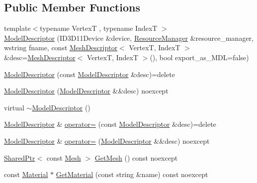 \subsection*{Public Member Functions}
\begin{DoxyCompactItemize}
\item 
{\footnotesize template$<$typename VertexT , typename IndexT $>$ }\\\hyperlink{classmage_1_1rendering_1_1_model_descriptor_aa27c73a72219352647cd31ddfd6e64d6}{Model\+Descriptor} (I\+D3\+D11\+Device \&device, \hyperlink{classmage_1_1rendering_1_1_resource_manager}{Resource\+Manager} \&resource\+\_\+manager, wstring fname, const \hyperlink{classmage_1_1rendering_1_1_mesh_descriptor}{Mesh\+Descriptor}$<$ VertexT, IndexT $>$ \&desc=\hyperlink{classmage_1_1rendering_1_1_mesh_descriptor}{Mesh\+Descriptor}$<$ VertexT, IndexT $>$(), bool export\+\_\+as\+\_\+\+M\+DL=false)
\item 
\hyperlink{classmage_1_1rendering_1_1_model_descriptor_af3fc0dea0060aa15a8003a7f4f807dd0}{Model\+Descriptor} (const \hyperlink{classmage_1_1rendering_1_1_model_descriptor}{Model\+Descriptor} \&desc)=delete
\item 
\hyperlink{classmage_1_1rendering_1_1_model_descriptor_a0e7a576be083c9499a074cfd39acbcb7}{Model\+Descriptor} (\hyperlink{classmage_1_1rendering_1_1_model_descriptor}{Model\+Descriptor} \&\&desc) noexcept
\item 
virtual \hyperlink{classmage_1_1rendering_1_1_model_descriptor_adef21799bc748828e8e04bc74f86aac0}{$\sim$\+Model\+Descriptor} ()
\item 
\hyperlink{classmage_1_1rendering_1_1_model_descriptor}{Model\+Descriptor} \& \hyperlink{classmage_1_1rendering_1_1_model_descriptor_a6d27a72aa2ebffbe4e7f2635f803dd72}{operator=} (const \hyperlink{classmage_1_1rendering_1_1_model_descriptor}{Model\+Descriptor} \&desc)=delete
\item 
\hyperlink{classmage_1_1rendering_1_1_model_descriptor}{Model\+Descriptor} \& \hyperlink{classmage_1_1rendering_1_1_model_descriptor_a52e9fbf292efc7a803d367bb3b6cb962}{operator=} (\hyperlink{classmage_1_1rendering_1_1_model_descriptor}{Model\+Descriptor} \&\&desc) noexcept
\item 
\hyperlink{namespacemage_a1e01ae66713838a7a67d30e44c67703e}{Shared\+Ptr}$<$ const \hyperlink{classmage_1_1rendering_1_1_mesh}{Mesh} $>$ \hyperlink{classmage_1_1rendering_1_1_model_descriptor_a65645313d8b7bb976d1b5d0acdbbd38a}{Get\+Mesh} () const noexcept
\item 
const \hyperlink{classmage_1_1rendering_1_1_material}{Material} $\ast$ \hyperlink{classmage_1_1rendering_1_1_model_descriptor_af731849a1aed71ae8e049571850e7f2e}{Get\+Material} (const string \&name) const noexcept

\end{DoxyCompactItemize}
